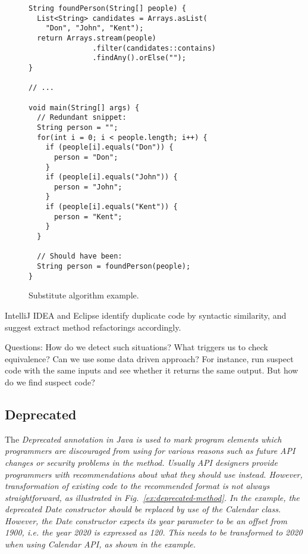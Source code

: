 \documentclass[runningheads,a4paper]{llncs}
\begin{document}
\begin{figure}
\begin{lstlisting}[mathescape=true,showstringspaces=false]
String foundPerson(String[] people) {
  List<String> candidates = Arrays.asList(
    "Don", "John", "Kent");
  return Arrays.stream(people)
               .filter(candidates::contains)
               .findAny().orElse("");
}

// ...

void main(String[] args) {
  // Redundant snippet:
  String person = "";
  for(int i = 0; i < people.length; i++) {
    if (people[i].equals("Don")) {
      person = "Don";
    }
    if (people[i].equals("John")) {
      person = "John";
    }
    if (people[i].equals("Kent")) {
      person = "Kent";
    }
  }

  // Should have been:
  String person = foundPerson(people);
}
\end{lstlisting}
\caption{Substitute algorithm example.}
\label{ex:substitute-algorithm}
\end{figure}

IntelliJ IDEA and Eclipse identify duplicate code by syntactic similarity, and
suggest extract method refactorings accordingly.


Questions: How do we detect such situations? What triggers us to check
equivalence? Can we use some data driven approach? For instance, run
suspect code with the same inputs and see whether it returns the same
output. But how do we find suspect code?


\subsection{Deprecated}

The \em{Deprecated} annotation in Java is used to mark program elements which
programmers are discouraged from using for various reasons such as future API
changes or security problems in the method. Usually API designers provide
programmers with recommendations about what they should use instead. However,
transformation of existing code to the recommended format is not always
straightforward, as illustrated in Fig.~\ref{ex:deprecated-method}. In the
example, the deprecated \em{Date} constructor should be replaced by use of the
\em{Calendar} class. However, the \em{Date} constructor expects its year
parameter to be an offset from 1900, i.e. the year 2020 is expressed as 120.
This needs to be transformed to 2020 when using \em{Calendar} API, as shown in
the example.
\end{document}
